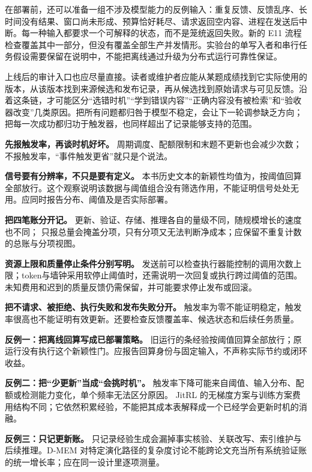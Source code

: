 在部署前，还可以准备一组不涉及模型能力的反例输入：重复反馈、反馈乱序、长时间没有结果、窗口尚未形成、预算恰好耗尽、请求返回空内容、进程在发送后中断。每一种输入都要求一个可解释的状态，而不是笼统返回失败。新的 E11 流程检查覆盖其中一部分，但没有覆盖全部生产并发情形。实验台的单写入者和串行任务假设需要保留在说明中，不能把离线通过升级为分布式运行可靠性保证。

上线后的审计入口也应尽量直接。读者或维护者应能从某题成绩找到它实际使用的版本，从该版本找到来源候选和发布记录，再从候选找到原始请求与可见反馈。沿着这条链，才可能区分“选错时机”“学到错误内容”“正确内容没有被检索”和“验收器改变”几类原因。把所有问题都归咎于模型不稳定，会让下一轮调参缺乏方向；把每一次成功都归功于触发器，也同样超出了记录能够支持的范围。



\begin{principlebox}
\textbf{先报触发率，再谈时机好坏。}
周期调度、配额限制和末题不更新也会减少次数；
不报触发率，“事件触发更省”就只是个说法。

\textbf{信号要有分辨率，不只是要有定义。}
本书历史文本的新颖性均值为，按阈值回算全部放行。这个观察说明该数据与阈值组合没有筛选作用，不能证明信号处处无用。应同时报告分布、阈值及是否实际部署。

\textbf{把四笔账分开记。}
更新、验证、存储、推理各自的量级不同，随规模增长的速度也不同；
只报总量会掩盖分项，只有分项又无法判断净成本；应保留不重复计数的总账与分项视图。

\textbf{资源上限和质量停止条件分别写明。}
发送前可以检查执行器能控制的调用次数上限；token与墙钟采用软停止阈值时，还需说明一次回复或执行跨过阈值的范围。未知费用和迟到的质量反馈仍需保留，并可能要求停止发布或回滚。

\textbf{把不请求、被拒绝、执行失败和发布失败分开。}
触发率为零不能证明稳定，触发率很高也不能证明有效更新。还要检查反馈覆盖率、候选状态和后续任务质量。
\end{principlebox}

\begin{pitfallbox}
\textbf{反例一：把离线回算写成已部署策略。}
旧运行的条经验按阈值回算全部放行；原运行没有执行这个新颖性门。应报告回算身份与固定输入，不声称实际节约或闭环收益。

\textbf{反例二：把“少更新”当成“会挑时机”。}
触发率下降可能来自阈值、输入分布、配额或检测能力变化，单个频率无法区分原因。
JitRL 的无梯度方案与训练方案费用结构不同\cite{jitrl-2601}；它依然积累经验，不能把其成本表解释成一个已经学会更新时机的消融。

\textbf{反例三：只记更新账。}
只记录经验生成会漏掉事实核验、关联改写、索引维护与后续推理。D-MEM 对特定演化路径的复杂度讨论\cite{dmem-2603}不能跨论文充当所有系统验证账的统一增长率；应在同一设计里逐项测量。
\end{pitfallbox}

